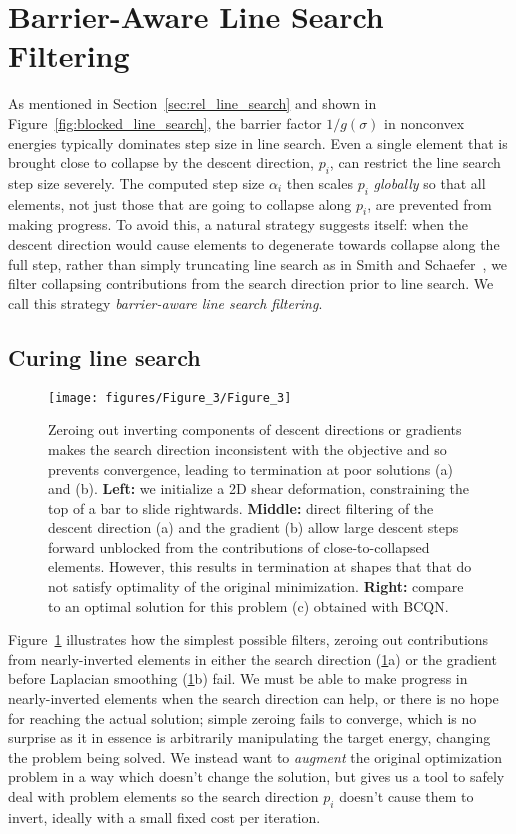 \section{Barrier-Aware Line Search Filtering}
\label{sec:constraints}

As mentioned in Section~\ref{sec:rel_line_search} and shown
in Figure~\ref{fig:blocked_line_search}, the barrier factor $1/g(\sigma)$
in nonconvex energies typically dominates step size in line search.
Even a single element that is brought close to collapse by the
descent direction, $p_i$, can restrict the line search step size
severely.  The computed step size $\alpha_i$ then scales $p_i$
\emph{globally} so that all elements, not just those that are going
to collapse along $p_i$, are prevented from making progress. To avoid
this, a natural strategy suggests itself: when the descent direction would cause
elements to degenerate towards collapse along the full step,
rather than simply truncating line search as in Smith and
Schaefer\ , we filter collapsing contributions
from the search direction prior to line search.
We call this strategy \emph{barrier-aware line search filtering}.

\subsection{Curing line search}

\begin{figure}[t!]
\centering
\texttt{[image: figures/Figure\_3/Figure\_3]}
\caption{
 Zeroing out inverting components of descent directions
or gradients makes the search direction inconsistent with the objective and so prevents convergence,
leading to termination at poor solutions (a) and (b).
{\bf Left:} we initialize a 2D shear deformation,
constraining the top of a bar to slide rightwards.
{\bf Middle:} direct filtering of the descent direction (a) and
the gradient (b) allow large descent steps forward unblocked
from the contributions of close-to-collapsed elements. However, this
results in termination at shapes that that do not satisfy optimality of the original minimization.
{\bf Right:} compare to an optimal solution for this problem (c)
obtained with BCQN.
 }
\label{fig:filter_fail}
\end{figure}

Figure~\ref{fig:filter_fail} illustrates how the simplest possible filters,
zeroing out contributions from nearly-inverted elements
in either the search direction (\ref{fig:filter_fail}a)
or the gradient before Laplacian smoothing (\ref{fig:filter_fail}b)
fail. We must be able to make progress in nearly-inverted elements
when the search direction can help, or there is no hope for reaching
the actual solution; simple zeroing fails to converge, which is
no surprise as it in essence is arbitrarily manipulating the
target energy, changing the problem being solved.
We instead want to \emph{augment} the original optimization problem
in a way which doesn't change the solution, but gives us a tool to
safely deal with problem elements so the search direction $p_i$ doesn't
cause them to invert, ideally with a small fixed cost per iteration.

